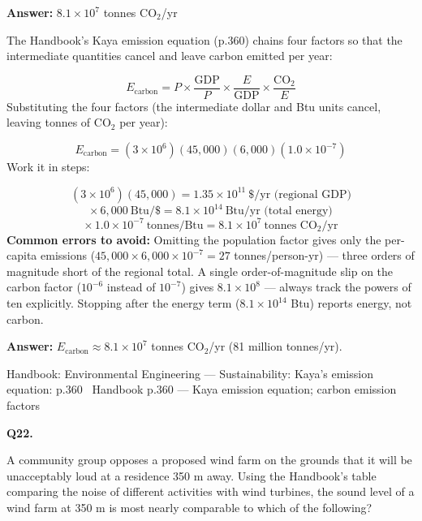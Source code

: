 \documentclass[11pt]{article}
\begin{document}
\vspace{2pt}\par\noindent\colorbox{boxbg}{\parbox{\dimexpr\linewidth-2\fboxsep\relax}{%
\vspace{2pt}\textbf{Answer:} $8.1 \times 10^{7}$ tonnes $\text{CO}_2$/yr\par\vspace{2pt}
{\small The Handbook's Kaya emission equation (p.360) chains four factors so that the intermediate quantities cancel and leave carbon emitted per year:\par
\[E_{\text{carbon}} = P \times \frac{\text{GDP}}{P} \times \frac{E}{\text{GDP}} \times \frac{\text{CO}_2}{E}\]
Substituting the four factors (the intermediate dollar and Btu units cancel, leaving tonnes of $\text{CO}_2$ per year):\par
\[E_{\text{carbon}} = (3\times10^6)(45{,}000)(6{,}000)(1.0\times10^{-7})\]
Work it in steps:\par
\[(3\times10^6)(45{,}000) = 1.35\times10^{11}\ \$/\text{yr (regional GDP)}\]
\[\times\,6{,}000\ \text{Btu}/\$ = 8.1\times10^{14}\ \text{Btu/yr (total energy)}\]
\[\times\,1.0\times10^{-7}\ \text{tonnes/Btu} = 8.1\times10^{7}\ \text{tonnes CO}_2/\text{yr}\]
\textbf{Common errors to avoid:} Omitting the population factor gives only the per-capita emissions ($45{,}000 \times 6{,}000 \times 10^{-7} = 27$ tonnes/person-yr) --- three orders of magnitude short of the regional total. A single order-of-magnitude slip on the carbon factor ($10^{-6}$ instead of $10^{-7}$) gives $8.1\times10^8$ --- always track the powers of ten explicitly. Stopping after the energy term ($8.1\times10^{14}$ Btu) reports energy, not carbon.\par
\textbf{Answer:} $E_{\text{carbon}} \approx 8.1\times10^{7}$ tonnes $\text{CO}_2$/yr (81 million tonnes/yr).\par}\par\vspace{2pt}
{\footnotesize\color{soft}Handbook: Environmental Engineering --- Sustainability: Kaya's emission equation: p.360 \textbullet\ Handbook p.360 --- Kaya emission equation; carbon emission factors}\vspace{2pt}
}}
\vspace{9pt}
\filbreak
\textbf{\color{accent}Q22.}\par\vspace{2pt}
A community group opposes a proposed wind farm on the grounds that it will be unacceptably loud at a residence 350 m away. Using the Handbook's table comparing the noise of different activities with wind turbines, the sound level of a wind farm at 350 m is most nearly comparable to which of the following?\par\par\vspace{3pt}
\end{document}
